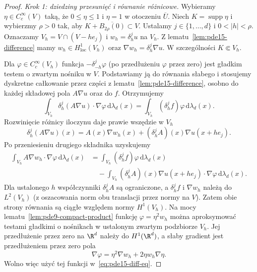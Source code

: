 \begin{proof}
\emph{Krok 1: dziedziny przesunięć i równanie różnicowe.}
Wybieramy $\eta\in C_c^\infty(V)$ taką, że
$0\le\eta\le1$ i $\eta=1$ w otoczeniu $\overline U$.
Niech $K=\operatorname{supp}\eta$ i wybierzmy $\rho>0$ tak,
aby $K+\overline{B_{2\rho}(0)}\subset V$.
Ustalamy $j\in\{1,\ldots,d\}$ i $0<|h|<\rho$.
Oznaczamy $V_h=V\cap(V-he_j)$ i $w_h=\delta_h^ju$ na $V_h$.
Z lematu~\ref{lem:pde15-difference} mamy
$w_h\in H^1_{\mathrm{loc}}(V_h)$ oraz
$\nabla w_h=\delta_h^j\nabla u$.
W szczególności $K\Subset V_h$.

Dla $\varphi\in C_c^\infty(V_h)$ funkcja
$-\delta_{-h}^j\varphi$ (po przedłużeniu $\varphi$
przez zero) jest gładkim testem o zwartym nośniku w $V$.
Podstawiamy ją do równania słabego
i stosujemy dyskretne całkowanie przez części
z lematu~\ref{lem:pde15-difference}, osobno do każdej
składowej pola $A\nabla u$ oraz do $f$.
Otrzymujemy
\[
 \int_{V_h}\delta_h^j(A\nabla u)\cdot\nabla\varphi\,
 \mathrm d\lambda_d(x)
 =\int_{V_h}(\delta_h^jf)\varphi\,\mathrm d\lambda_d(x).
\]
Rozwinięcie różnicy iloczynu daje prawie wszędzie w $V_h$
\[
 \delta_h^j(A\nabla u)(x)
 =A(x)\nabla w_h(x)
   +(\delta_h^jA)(x)\nabla u(x+he_j).
\]
Po przeniesieniu drugiego składnika uzyskujemy
\begin{equation}\label{eq:pde15-diff-eq}
 \begin{aligned}
 \int_{V_h} A\nabla w_h\cdot\nabla\varphi\,\mathrm d\lambda_d(x)
 &=\int_{V_h}(\delta_h^jf)\varphi\,\mathrm d\lambda_d(x)\\
 &\quad-\int_{V_h}(\delta_h^jA)(x)\nabla u(x+he_j)
       \cdot\nabla\varphi\,\mathrm d\lambda_d(x).
 \end{aligned}
\end{equation}
Dla ustalonego $h$ współczynniki $\delta_h^jA$ są ograniczone,
a $\delta_h^jf$ i $\nabla w_h$ należą do $L^2(V_h)$
(z oszacowania norm obu translacji przez normy na $V$).
Zatem obie strony równania są ciągłe względem normy
$H^1(V_h)$. Na mocy lematu~\ref{lem:pde9-compact-product}
funkcję $\varphi=\eta^2w_h$ można aproksymować testami
gładkimi o nośnikach w ustalonym zwartym podzbiorze $V_h$.
Jej przedłużenie przez zero na $\R^d$ należy do
$H^1(\R^d)$, a słaby gradient jest przedłużeniem przez zero
pola
\[
 \nabla\varphi=\eta^2\nabla w_h+2\eta w_h\nabla\eta.
\]
Wolno więc użyć tej funkcji w~\eqref{eq:pde15-diff-eq}.


\end{proof}
